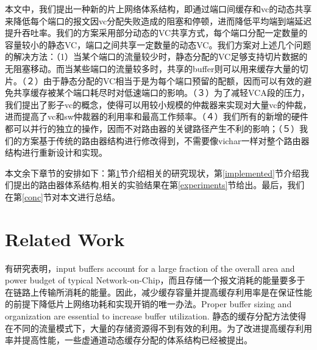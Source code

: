 ﻿\documentclass[10pt,journal]{IEEEtran}
\begin{document}
本文中，我们提出一种新的片上网络体系结构，即通过端口间缓存和vc的动态共享来降低每个端口的报文因vc分配失败造成的阻塞和停顿，进而降低平均端到端延迟提升吞吐率。我们的方案采用部分动态的VC共享方式，每个端口分配一定数量的容量较小的静态VC，端口之间共享一定数量的动态VC。我们方案对上述几个问题的解决方法：（1）当某个端口的流量较少时，静态分配的VC足够支持切片数据的无阻塞移动。而当某些端口的流量较多时，共享的buffer则可以用来缓存大量的切片。（２）由于静态分配的VC相当于是为每个端口预留的配额，因而可以有效的避免共享缓存被某个端口耗尽时对低速端口的影响。（３）为了减轻VCA段的压力，我们提出了影子vc的概念，使得可以用较小规模的仲裁器来实现对大量vc的仲裁，进而提高了vc和sw仲裁器的利用率和最高工作频率。（４）我们所有的新增的硬件都可以并行的独立的操作，因而不对路由器的关键路径产生不利的影响；（５）我们的方案基于传统的路由器结构进行修改得到，不需要像vichar一样对整个路由器结构进行重新设计和实现。

本文余下章节的安排如下：第\ref{related}节介绍相关的研究现状，第\ref{implemented}节介绍我们提出的路由器体系结构,相关的实验结果在第\ref{experiments}节给出。最后，我们在第\ref{conc}节对本文进行总结。

\section{Related Work}\label{related}
有研究表明，input buffers account for a large fraction of the overall area and power budget of typical Network-on-Chip，而且存储一个报文消耗的能量要多于在链路上传输所消耗的能量\cite{1012681}。因此，减少缓存容量并提高缓存利用率是在保证性能的前提下降低片上网络功耗和实现开销的唯一办法。Proper buffer sizing and organization are essential to increase buffer utilization. 静态的缓存分配方法使得在不同的流量模式下，大量的存储资源得不到有效的利用。为了改进提高缓存利用率并提高性能，一些虚通道动态缓存分配的体系结构已经被提出。
\end{document}
